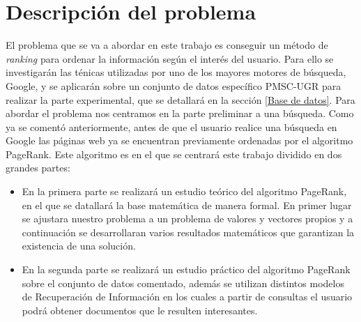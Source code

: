 \documentclass[size=a4, parskip=half, titlepage=false, toc=flat, toc=bib, 12pt]{scrartcl}
\theoremstyle{theorem-style}
\theoremstyle{definition-style}
\theoremstyle{remark-style}
\theoremstyle{example-style}
\theoremstyle{definition-style}
\theoremstyle{remark-style}
\begin{document}
\begin{itemize}
\end{itemize}

\newpage

\section{Descripción del problema}
El problema que se va a abordar en este trabajo es conseguir un método de \textit{ranking} para ordenar la información según el interés del usuario. Para ello se investigarán las ténicas utilizadas por uno de los mayores motores de búsqueda, Google, y se aplicarán sobre un conjunto de datos específico PMSC-UGR para realizar la parte experimental, que se detallará en la sección \ref{Base de datos}. Para abordar el problema nos centramos en la parte preliminar a una búsqueda. Como ya se comentó anteriormente, antes de que el usuario realice una búsqueda en Google las páginas web ya se encuentran previamente ordenadas por el algoritmo PageRank. Este algoritmo  es en el que se centrará este trabajo dividido en dos grandes partes:
\begin{itemize}
\item En la primera parte se realizará un estudio teórico del algoritmo PageRank, en el que se datallará la base matemática de manera formal. En primer lugar se ajustara nuestro problema a un problema de valores y vectores propios y a continuación se desarrollaran varios resultados matemáticos que garantizan la existencia de una solución.
\item En la segunda parte se realizará un estudio práctico del algoritmo PageRank sobre el conjunto de datos comentado, además se utilizan distintos modelos de Recuperación de Información en los cuales a partir de consultas el usuario podrá obtener documentos que le resulten interesantes.
\end{itemize}

\newpage
\end{document}
